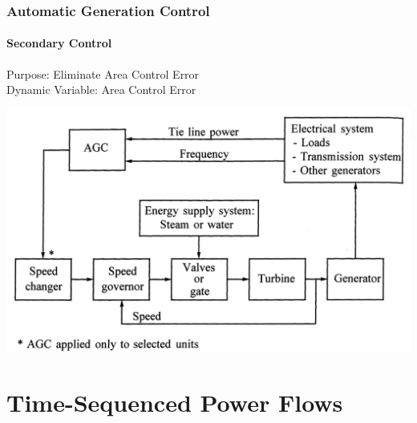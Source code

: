 \documentclass[14pt, unknownkeysallowed]{beamer}
\begin{document}
\begin{frame}
\frametitle{Automatic Generation Control}
\framesubtitle{Secondary Control}

Purpose: Eliminate Area Control Error\\
\vspace{.5em}
Dynamic Variable: Area Control Error \\

\begin{center}
\includegraphics[height=.55\textheight]{AGCblockdiagram}
{\tiny\cite{Kundur}}
\end{center}
\end{frame}


\section{Time-Sequenced Power Flows}
\end{document}
